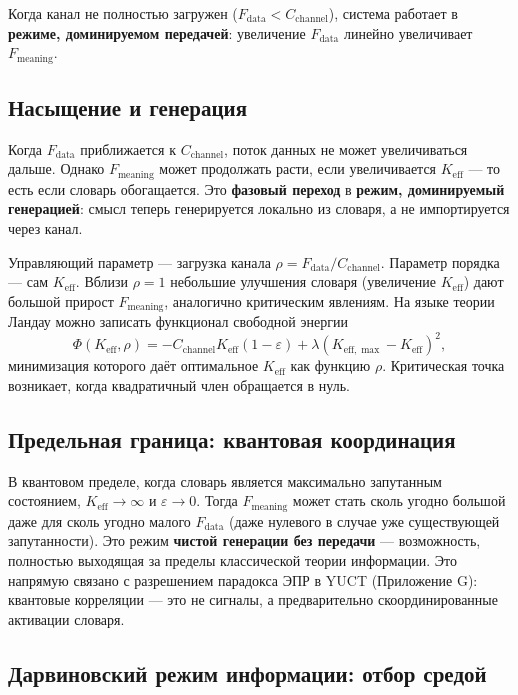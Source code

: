 \documentclass[12pt,a4paper]{article}
\theoremstyle{remark}
\newcommand{\Keff}{K_{\mathrm{eff}}}
\newcommand{\Keffmax}{K_{\mathrm{eff},\max}}
\begin{document}
	Когда канал не полностью загружен ($F_{\text{data}} < C_{\text{channel}}$), система работает в \textbf{режиме, доминируемом передачей}: увеличение $F_{\text{data}}$ линейно увеличивает $F_{\text{meaning}}$.
	
	\subsection{Насыщение и генерация}
	
	Когда $F_{\text{data}}$ приближается к $C_{\text{channel}}$, поток данных не может увеличиваться дальше. Однако $F_{\text{meaning}}$ может продолжать расти, если увеличивается $\Keff$ — то есть если словарь обогащается. Это \textbf{фазовый переход} в \textbf{режим, доминируемый генерацией}: смысл теперь генерируется локально из словаря, а не импортируется через канал.
	
	Управляющий параметр — загрузка канала $\rho = F_{\text{data}} / C_{\text{channel}}$. Параметр порядка — сам $\Keff$. Вблизи $\rho = 1$ небольшие улучшения словаря (увеличение $\Keff$) дают большой прирост $F_{\text{meaning}}$, аналогично критическим явлениям. На языке теории Ландау можно записать функционал свободной энергии
	\[
	\Phi(\Keff, \rho) = -C_{\text{channel}} \Keff (1 - \varepsilon) + \lambda (\Keffmax - \Keff)^2,
	\]
	минимизация которого даёт оптимальное $\Keff$ как функцию $\rho$. Критическая точка возникает, когда квадратичный член обращается в нуль.
	
	\subsection{Предельная граница: квантовая координация}
	
	В квантовом пределе, когда словарь является максимально запутанным состоянием, $\Keff \to \infty$ и $\varepsilon \to 0$. Тогда $F_{\text{meaning}}$ может стать сколь угодно большой даже для сколь угодно малого $F_{\text{data}}$ (даже нулевого в случае уже существующей запутанности). Это режим \textbf{чистой генерации без передачи} — возможность, полностью выходящая за пределы классической теории информации. Это напрямую связано с разрешением парадокса ЭПР в YUCT (Приложение G): квантовые корреляции — это не сигналы, а предварительно скоординированные активации словаря.
	
	\subsection{Дарвиновский режим информации: отбор средой}
	\label{subsec:darwinian-regime}
	
\end{document}
